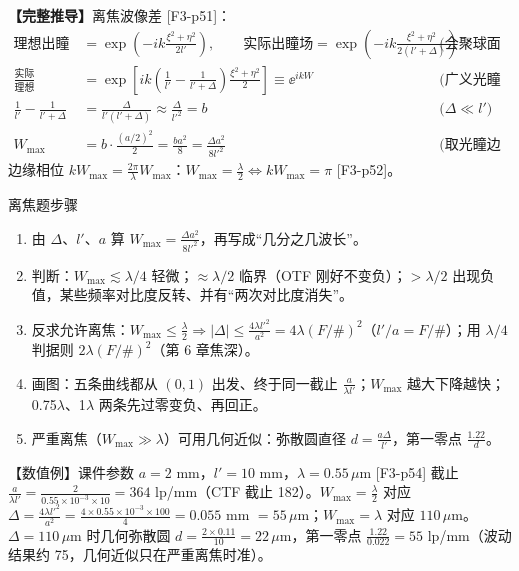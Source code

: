 \textbf{【完整推导】}离焦波像差 [F3-p51]：
\begin{align*}
\text{理想出瞳场}&=\exp\!\left(-ik\frac{\xi^2+\eta^2}{2l'}\right),\qquad\text{实际出瞳场}=\exp\!\left(-ik\frac{\xi^2+\eta^2}{2(l'+\Delta)}\right) &&\text{(会聚球面波)}\\
\frac{\text{实际}}{\text{理想}}&=\exp\!\left[ik\left(\frac1{l'}-\frac{1}{l'+\Delta}\right)\frac{\xi^2+\eta^2}{2}\right]\equiv\ee^{ikW} &&\text{(广义光瞳的定义)}\\
\frac1{l'}-\frac1{l'+\Delta}&=\frac{\Delta}{l'(l'+\Delta)}\approx\frac{\Delta}{l'^2}=b &&\text{($\Delta\ll l'$)}\\
W_{\max}&=b\cdot\frac{(a/2)^2}{2}=\frac{ba^2}{8}=\frac{\Delta a^2}{8l'^2} &&\text{(取光瞳边缘)}
\end{align*}
边缘相位 $kW_{\max}=\frac{2\pi}{\lambda}W_{\max}$：$W_{\max}=\frac\lambda2\Leftrightarrow kW_{\max}=\pi$ [F3-p52]。

\begin{recipe}{离焦题步骤}
\begin{enumerate}
\item 由 $\Delta$、$l'$、$a$ 算 $W_{\max}=\frac{\Delta a^2}{8l'^2}$，再写成“几分之几波长”。
\item 判断：$W_{\max}\lesssim\lambda/4$ 轻微；$\approx\lambda/2$ 临界（OTF 刚好不变负）；$>\lambda/2$ 出现负值，某些频率对比度反转、并有“两次对比度消失”。
\item 反求允许离焦：$W_{\max}\le\frac\lambda2\Rightarrow|\Delta|\le\frac{4\lambda l'^2}{a^2}=4\lambda(F/\#)^2$（$l'/a=F/\#$）；用 $\lambda/4$ 判据则 $2\lambda(F/\#)^2$（第 6 章焦深）。
\item 画图：五条曲线都从 $(0,1)$ 出发、终于同一截止 $\frac{a}{\lambda l'}$；$W_{\max}$ 越大下降越快；0.75$\lambda$、1$\lambda$ 两条先过零变负、再回正。
\item 严重离焦（$W_{\max}\gg\lambda$）可用几何近似：弥散圆直径 $d=\frac{a\Delta}{l'}$，第一零点 $\frac{1.22}{d}$。
\end{enumerate}
\end{recipe}

\begin{exam}{【数值例】课件参数 $a=2$ mm，$l'=10$ mm，$\lambda=0.55\,\mu$m [F3-p54]}
截止 $\frac{a}{\lambda l'}=\frac{2}{0.55\times10^{-3}\times10}=364$ lp/mm（CTF 截止 182）。$W_{\max}=\frac\lambda2$ 对应 $\Delta=\frac{4\lambda l'^2}{a^2}=\frac{4\times0.55\times10^{-3}\times100}{4}=0.055$ mm $=55\,\mu$m；$W_{\max}=\lambda$ 对应 $110\,\mu$m。$\Delta=110\,\mu$m 时几何弥散圆 $d=\frac{2\times0.11}{10}=22\,\mu$m，第一零点 $\frac{1.22}{0.022}=55$ lp/mm（波动结果约 75，几何近似只在严重离焦时准）。
\end{exam}

